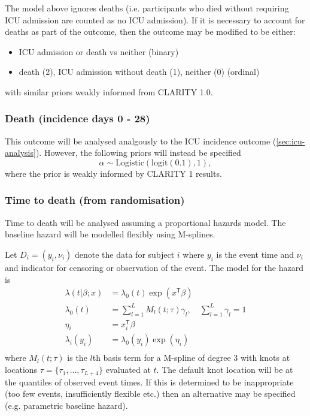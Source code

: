 \documentclass[11pt,parskip=half-]{scrartcl}
\begin{document}
The model above ignores deaths (i.e. participants who died without requiring ICU admission are counted as no ICU admission). If it is necessary to account for deaths as part of the outcome, then the outcome may be modified to be either:
\begin{itemize}
    \item ICU admission or death vs neither (binary)
    \item death (2), ICU admission without death (1), neither (0) (ordinal)
\end{itemize}
with similar priors weakly informed from CLARITY 1.0.

\subsubsection{Death (incidence days 0 - 28)}
This outcome will be analysed analgously to the ICU incidence outcome (\ref{sec:icu-analysis}). However, the following priors will instead be specified
$$
    \alpha \sim \text{Logistic}(\text{logit}(0.1), 1),
$$
where the prior is weakly informed by CLARITY 1 results.

\subsubsection{Time to death (from randomisation)}
Time to death will be analysed assuming a proportional hazards model. The baseline hazard will be modelled flexibly using M-splines.

Let $D_i = (y_i, \nu_i)$ denote the data for subject $i$ where $y_i$ is the event time and $\nu_i$ and indicator for censoring or observation of the event. The model for the hazard is
$$
    \begin{aligned}
        \lambda(t|\beta;x) & = \lambda_0(t)\exp(x^\mathsf{T}\beta)                           \\
        \lambda_0(t)       & = \sum_{l=1}^L M_l(t;\tau)\gamma_l,\quad \sum_{l=1}^L\gamma_l=1 \\
        \eta_i             & = x_i^\mathsf{T}\beta                                           \\
        \lambda_i(y_i)     & = \lambda_0(y_i)\exp(\eta_i)                                    \\
    \end{aligned}
$$
where $M_l(t;\tau)$ is the $l$th basis term for a M-spline of degree 3 with knots at locations $\tau=\{\tau_1,...,\tau_{L+4}\}$ evaluated at $t$. The default knot location will be at the quantiles of observed event times. If this is determined to be inappropriate (too few events, insufficiently flexible etc.) then an alternative may be specified (e.g. parametric baseline hazard).
\end{document}
